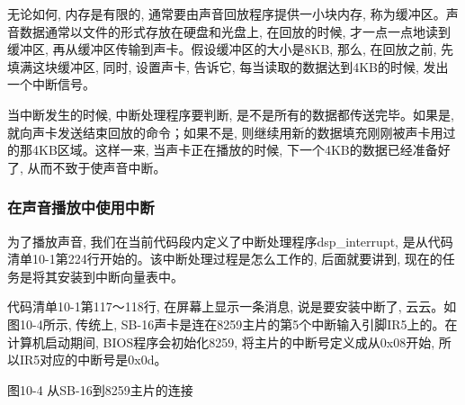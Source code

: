 \documentclass[12pt]{article}
\begin{document}
\begin{CJK}{UTF8}{gbsn}
无论如何, 内存是有限的, 通常要由声音回放程序提供一小块内存, 称为缓冲区。声音数据通常以文件的形式存放在硬盘和光盘上, 在回放的时候, 才一点一点地读到缓冲区, 再从缓冲区传输到声卡。假设缓冲区的大小是8KB, 那么, 在回放之前, 先填满这块缓冲区, 同时, 设置声卡, 告诉它, 每当读取的数据达到4KB的时候, 发出一个中断信号。

当中断发生的时候, 中断处理程序要判断, 是不是所有的数据都传送完毕。如果是, 就向声卡发送结束回放的命令；如果不是, 则继续用新的数据填充刚刚被声卡用过的那4KB区域。这样一来, 当声卡正在播放的时候, 下一个4KB的数据已经准备好了, 从而不致于使声音中断。

\subsubsection{在声音播放中使用中断}
为了播放声音, 我们在当前代码段内定义了中断处理程序dsp\_{}interrupt, 是从代码清单10-1第224行开始的。该中断处理过程是怎么工作的, 后面就要讲到, 现在的任务是将其安装到中断向量表中。

代码清单10-1第117～118行, 在屏幕上显示一条消息, 说是要安装中断了, 云云。如图10-4所示, 传统上, SB-16声卡是连在8259主片的第5个中断输入引脚IR5上的。在计算机启动期间, BIOS程序会初始化8259, 将主片的中断号定义成从0x08开始, 所以IR5对应的中断号是0x0d。
 
图10-4  从SB-16到8259主片的连接

\begin{comment}
第120～123行, 和以前一样, 把中断号乘以4, 就得到了它在中断向量表中的登记项。事实上, 因为将一个二进制数逻辑左移2次就相当于乘以4, 所以这几句等效于
mov bx,0x0d
shl bx,2
不过, 这样一来, 指令的功能和意图就显得不是那么明显了。
第125行, 在修改中断向量表的时候, 要禁止外部中断。
第127～137行, 先将段寄存器ES压栈保存, 再使它指向逻辑段0x0000, 这是中断向量表所在的段。接着, 用新的段地址和偏移地址修改0x0d号中断的登记项。0x0d号中断所在的登记项, 其偏移地址已经位于寄存器BX中；新的0x0d号中断处理过程位于当前代码段, 段地址自然由段寄存器CS提供, 偏移地址就是标号dsp\_{}interrupt的汇编地址。当然, 最后还要从堆栈中恢复段寄存器ES的内容。
第137行, 开放外部中断。
既然中断处理过程的入口地址已经安装停当, 第140～142行, 修改8259主片的中断屏蔽寄存器, 使其第5位为“0”, 意思是允许中断信号进入, 同时保持其它位不变。这几句执行之后, 来自声卡的中断请求将会被8259接受。
第144～145行, 显示一条信息, 提示中断处理过程已经安装好了。
10.4  DMA控制器的结构、功能和初始化
10.4.1  个人计算机中的DMA控制器
如图10-5所示, 在二十年前, 个人计算机系统的组成大致就是这个样子。那个时候, 已经有了集成外围芯片, 内部集成了8259、RTC/CMOS RAM、DMA控制器、定时器/计数器、串/并行通信器、键盘控制器等, 但并不如现在的ICH智能。
 

\end{comment}
\end{CJK}
\end{document}
